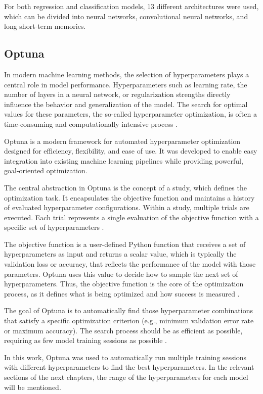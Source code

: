 For both regression and classification models, 13 different architectures were used, which can be divided into neural networks, convolutional neural networks, and long short-term memories.

\subsection{Optuna}

In modern machine learning methods, the selection of hyperparameters plays a central role in model performance.
Hyperparameters such as learning rate, the number of layers in a neural network, or regularization strengths directly influence the behavior and generalization of the model.
The search for optimal values for these parameters, the so-called hyperparameter optimization, is often a time-consuming and computationally intensive process \cite{hyperparameter-importance}.

Optuna is a modern framework for automated hyperparameter optimization designed for efficiency, flexibility, and ease of use.
It was developed to enable easy integration into existing machine learning pipelines while providing powerful, goal-oriented optimization.

The central abstraction in Optuna is the concept of a study, which defines the optimization task.
It encapsulates the objective function and maintains a history of evaluated hyperparameter configurations.
Within a study, multiple trials are executed.
Each trial represents a single evaluation of the objective function with a specific set of hyperparameters \cite{optuna-basics}.

The objective function is a user-defined Python function that receives a set of hyperparameters as input and returns a scalar value, which is typically the validation loss or accuracy, that reflects the performance of the model with those parameters.
Optuna uses this value to decide how to sample the next set of hyperparameters.
Thus, the objective function is the core of the optimization process, as it defines what is being optimized and how success is measured \cite{optuna-basics}.

The goal of Optuna is to automatically find those hyperparameter combinations that satisfy a specific optimization criterion (e.g., minimum validation error rate or maximum accuracy).
The search process should be as efficient as possible, requiring as few model training sessions as possible \cite{optuna-hyperparameters}.

In this work, Optuna was used to automatically run multiple training sessions with different hyperparameters to find the best hyperparameters.
In the relevant sections of the next chapters, the range of the hyperparameters for each model will be mentioned.

